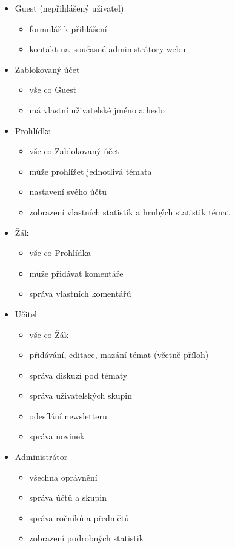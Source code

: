 \documentclass[thesis=B,czech]{FITthesis}[2012/06/26]
\begin{document}
\begin{itemize}
	\item Guest (nepřihlášený uživatel)
	\begin{itemize}
		\item formulář k přihlášení
		\item kontakt na~současné administrátory webu
	\end{itemize}
	
	\item Zablokovaný účet
	\begin{itemize}
		\item vše co Guest
		\item má vlastní uživatelské jméno a heslo
	\end{itemize}

	\item Prohlídka
	\begin{itemize}
		\item vše co Zablokovaný účet
		\item může prohlížet jednotlivá témata
		\item nastavení svého účtu
		\item zobrazení vlastních statistik a hrubých statistik témat
	\end{itemize}

	\item Žák
	\begin{itemize}
		\item vše co Prohlídka
		\item může přidávat komentáře
		\item správa vlastních komentářů		
	\end{itemize}

	\item Učitel
	\begin{itemize}
		\item vše co Žák
		\item přidávání, editace, mazání témat (včetně příloh)
		\item správa diskuzí pod tématy
		\item správa uživatelských skupin
		\item odesílání newsletteru
		\item 	správa novinek
	\end{itemize}

	\item Administrátor
	\begin{itemize}
		\item všechna oprávnění
		\item správa účtů a skupin
		\item správa ročníků a předmětů
		\item zobrazení podrobných statistik
	\end{itemize}
\end{itemize}
\end{document}
